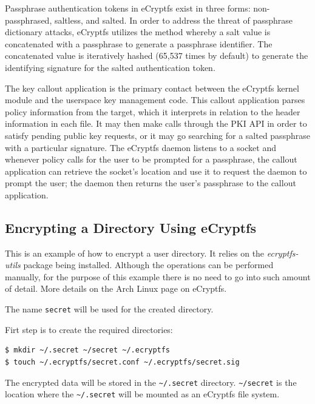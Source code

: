Passphrase authentication tokens in eCryptfs exist in three forms: non-passphrased, saltless, and salted. In order to address the threat of passphrase dictionary attacks, eCryptfs utilizes the method whereby a salt value is concatenated with a passphrase to generate a passphrase identifier. The concatenated value is iteratively hashed (65,537 times by default) to generate the identifying signature for the salted authentication token.\cite{ecryptfs-paper}

The key callout application is the primary contact between the eCryptfs kernel module and the userspace key management code. This callout application parses policy information from the target, which it interprets in relation to the header information in each file. It may then make calls through the PKI API in order to satisfy pending public key requests, or it may go searching for a salted passphrase with a particular signature. The eCryptfs daemon listens to a socket and whenever policy calls for the user to be prompted for a passphrase, the callout application can retrieve the socket’s location and use it to request the daemon to prompt the user; the daemon then returns the user’s passphrase to the callout application.

\subsection{Encrypting a Directory Using eCryptfs}
\label{sub-sec:encrypt-dir-ecryptfs}

This is an example of how to encrypt a user directory. It relies on the \textit{ecryptfs-utils} package being installed. Although the operations can be performed manually, for the purpose of this example there is no need to go into such amount of detail. More details on the Arch Linux page on eCryptfs.\cite{ecryptfs}

The name \texttt{secret} will be used for the created directory.

Firt step is to create the required directories:
\begin{lstlisting}[numbers=none]
$ mkdir ~/.secret ~/secret ~/.ecryptfs
$ touch ~/.ecryptfs/secret.conf ~/.ecryptfs/secret.sig
\end{lstlisting}

The encrypted data will be stored in the \texttt{\textasciitilde/.secret} directory.
\texttt{\textasciitilde/secret} is the location where the \texttt{\textasciitilde/.secret} will be mounted as an eCryptfs file system.

